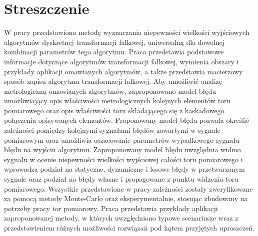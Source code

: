 \chapter*{Streszczenie}

W pracy przedstawiono metodę wyznaczania niepewności wielkości wyjściowych algorytmów dyskretnej transformacji falkowej, uniwersalną dla dowolnej kombinacji parametrów tego algorytmu. Praca przedstawia podstawowe informacje dotyczące algorytmów transformacji falkowej, wymienia obszary i przykłady aplikacji omawianych algorytmów, a także przedstawia macierzowy sposób zapisu algorytmu transformacji falkowej. Aby umożliwić analizę metrologiczną omawianych algorytmów, zaproponowano model błędu umożliwiający opis właściwości metrologicznych kolejnych elementów toru pomiarowego oraz opis właściwości toru składającego się z kaskadowego połączenia opisywanych elementów. Proponowany model błędu pozwala określić zależności pomiędzy kolejnymi sygnałami błędów zawartymi w sygnale pomiarowym oraz umożliwia oszacowanie parametrów wypadkowego sygnału błędu na wyjściu algorytmu. Zaproponowany model błędu uwzględnia widmo sygnału w ocenie niepewności wielkości wyjściowej całości toru pomiarowego i wprowadza podział na statyczne, dynamiczne i losowe błędy w przetwarzanym sygnale oraz podział na błędy własne i propagowane z punktu widzenia toru pomiarowego. Wszystkie przedstawione w pracy zależności zostały zweryfikowane za pomocą metody Monte-Carlo oraz eksperymentalnie, stosując zbudowany na potrzeby pracy tor pomiarowy. Praca przedstawia przykłady aplikacji zaproponowanej metody, w których uwzględniono typowe scenariusze wraz z przedstawieniem różnych możliwości rozwiązań pod kątem przyjętych uproszczeń.
